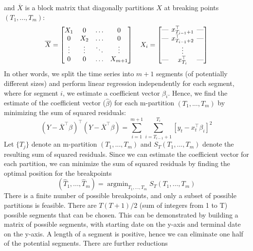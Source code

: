 \documentclass[main.tex]{subfiles}
\begin{document}
and $\overline{X}$ is a block matrix that
diagonally partitions $X$ at breaking points $(T_1,..., T_m)$:
\[
\overline{X} =
\begin{bmatrix}
X_1 & 0 & \hdots & 0\\
 0 & X_2 & \hdots & 0 \\
\vdots & \vdots & \ddots & \vdots \\
 0 & 0 & \hdots & X_{m+1} 
\end{bmatrix}
\quad
X_i = 
\begin{bmatrix}
  \text{---} \hspace{-0.2cm} & x_{T_{i-1} + 1}^{\top} & \hspace{-0.2cm}\text{---} \\
  \text{---} \hspace{-0.2cm} & x_{T_{i-1} + 2}^{\top} & \hspace{-0.2cm}\text{---} \\
  & \vdots & \\ 
 \text{---} \hspace{-0.2cm} & x_{T_i}^{\top} & \hspace{-0.2cm}\text{---}  \\
\end{bmatrix}
\]
In other words, we split the time series into $m+1$ segments (of potentially
different sizes) and perform linear
regression independently for each segment, where for segment $i$, we estimate
a coefficient vector $\beta_i$.
Hence, we find the estimate of the coefficient vector ($\hat{\beta}$) for each
m-partition $(T_1, ..., T_m)$ by minimizing the sum of squared residuals:
\[
(Y - \overline{X}^{\top}\beta)^{\top} (Y - \overline{X}^{\top}\beta) =
\sum_{i=1}^{m+1}\sum_{i=T_{i-1} + 1}^{T_i} \left[ y_t - x_t^{\top}\beta_i \right]^2
\]
Let $\{T_j\}$ denote an m-partition $(T_1, ..., T_m)$ and $S_T(T_1, ..., T_m)$
denote the resulting sum of squared residuals. Since we can estimate the
coefficient vector for each partition, we can minimize the sum of
squared residuals by finding the optimal position for the breakpoints
\[
(\hat{T}_1, ..., \hat{T}_m) = \operatorname{argmin}_{T_{1}, \ldots, T_{m}}
S_{T}\left(T_{1}, \ldots, T_{m}\right)
\]
There is a finite number of possible breakpoints, and only a subset of
possible partitions is feasible. There are $T(T+1)/2$ (sum of integers from 1 to T)
possible segments that can be chosen. This can be demonstrated by building a
matrix of possible segments, with starting date on the y-axis and terminal date
on the y-axis. A length of a segment is positive, hence we can eliminate
one half of the potential segments. There are further reductions
\end{document}
